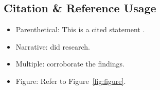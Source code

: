 \subsection{Citation \& Reference Usage}
\begin{itemize}
    \item Parenthetical: This is a cited statement \parencite{Lu2023}.
    \item Narrative: \textcite{Lu2023} did research.
    \item Multiple: \parencite{Lu2023, Seiti2023} corroborate the findings.
    \item Figure: Refer to Figure~\ref{fig:figure}.
\end{itemize}
